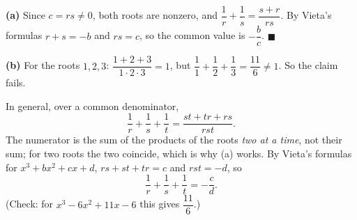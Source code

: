 \textbf{(a)} Since $c=rs\ne0$, both roots are nonzero, and $\dfrac1r+\dfrac1s=\dfrac{s+r}{rs}$. By Vieta's formulas $r+s=-b$ and $rs=c$, so the common value is $\boxed{-\dfrac bc}$. $\blacksquare$

\textbf{(b)} For the roots $1,2,3$: $\dfrac{1+2+3}{1\cdot2\cdot3}=1$, but $\dfrac11+\dfrac12+\dfrac13=\dfrac{11}6\ne1$. So the claim fails.

In general, over a common denominator,
\[\dfrac1r+\dfrac1s+\dfrac1t=\dfrac{st+tr+rs}{rst}.\]
The numerator is the sum of the products of the roots \emph{two at a time}, not their sum; for two roots the two coincide, which is why (a) works. By Vieta's formulas for $x^3+bx^2+cx+d$, $rs+st+tr=c$ and $rst=-d$, so
\[\dfrac1r+\dfrac1s+\dfrac1t=\boxed{-\dfrac cd}.\]
(Check: for $x^3-6x^2+11x-6$ this gives $\dfrac{11}6$.)
